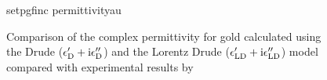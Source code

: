 \begin{figure}[ht]
  \centering
  {setpgfinc}
  {permittivityau}
  \caption{Comparison of the complex permittivity for gold calculated using the
    Drude ($\epsilon^\prime_\mathrm{D} + {\mathrm{i}}
      \epsilon^{\prime\prime}_\mathrm{D}$) and the Lorentz Drude
    ($\epsilon^\prime_\mathrm{LD} + {\mathrm{i}}
      \epsilon^{\prime\prime}_\mathrm{LD}$) model compared with experimental
    results by ~\cite{theye1970investigation}}
  \label{fig:permittivityau} \end{figure}

